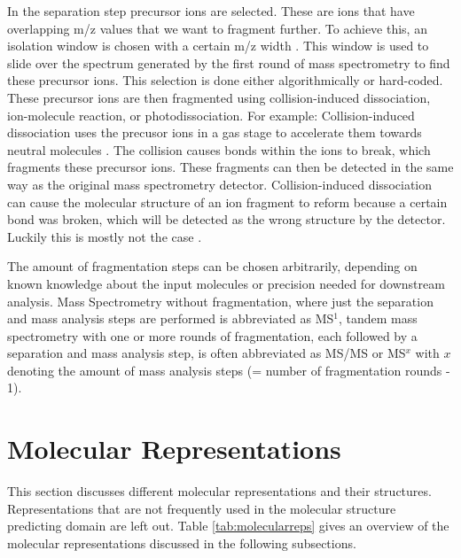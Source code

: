 In the separation step precursor ions are selected. These are ions that have overlapping m/z values that we want to fragment further. To achieve this, an isolation window is chosen with a certain m/z width \cite{defossez2023eight}. This window is used to slide over the spectrum generated by the first round of mass spectrometry to find these precursor ions. This selection is done either algorithmically or hard-coded. These precursor ions are then fragmented using collision-induced dissociation, ion-molecule reaction, or photodissociation. For example: Collision-induced dissociation uses the precusor ions in a gas stage to accelerate them towards neutral molecules \cite{wells2005collision}. The collision causes bonds within the ions to break, which fragments these precursor ions. These fragments can then be detected in the same way as the original mass spectrometry detector. Collision-induced dissociation can cause the molecular structure of an ion fragment to reform because a certain bond was broken, which will be detected as the wrong structure by the detector. Luckily this is mostly not the case \cite{molina2008comprehensive}.

The amount of fragmentation steps can be chosen arbitrarily,
depending on known knowledge about the input molecules or precision needed for downstream analysis.
Mass Spectrometry without fragmentation, where just the separation and mass analysis steps are performed is abbreviated as MS$^1$,
tandem mass spectrometry with one or more rounds of fragmentation, each followed by a separation and mass analysis step, is often abbreviated as MS/MS or MS$^x$ with $x$ denoting the amount of mass analysis steps (= number of fragmentation rounds - 1).

\section{Molecular Representations}
\label{sec:molrepr}

This section discusses different molecular representations and their structures. Representations that are not frequently used in the molecular structure predicting domain are left out. Table \ref{tab:molecularreps} gives an overview of the molecular representations discussed in the following subsections.

